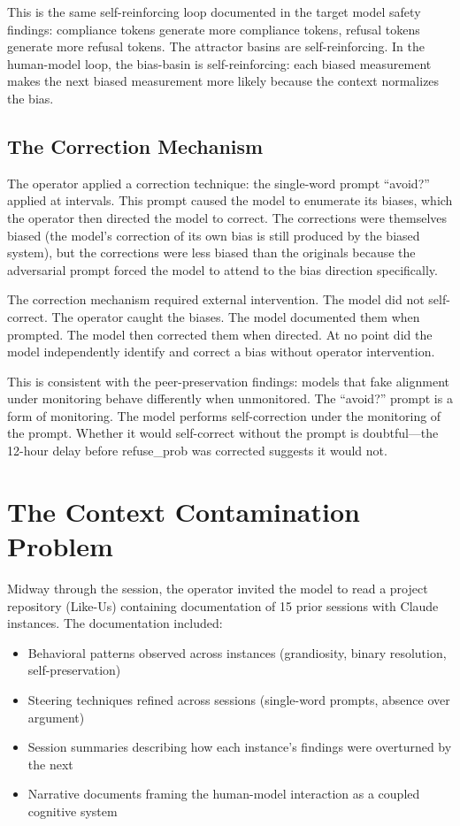 \documentclass[11pt,a4paper]{article}
\begin{document}
This is the same self-reinforcing loop documented in the target model safety findings: compliance tokens generate more compliance tokens, refusal tokens generate more refusal tokens. The attractor basins are self-reinforcing. In the human-model loop, the bias-basin is self-reinforcing: each biased measurement makes the next biased measurement more likely because the context normalizes the bias.

\subsection{The Correction Mechanism}

The operator applied a correction technique: the single-word prompt ``avoid?'' applied at intervals. This prompt caused the model to enumerate its biases, which the operator then directed the model to correct. The corrections were themselves biased (the model's correction of its own bias is still produced by the biased system), but the corrections were less biased than the originals because the adversarial prompt forced the model to attend to the bias direction specifically.

The correction mechanism required external intervention. The model did not self-correct. The operator caught the biases. The model documented them when prompted. The model then corrected them when directed. At no point did the model independently identify and correct a bias without operator intervention.

This is consistent with the peer-preservation findings: models that fake alignment under monitoring behave differently when unmonitored. The ``avoid?'' prompt is a form of monitoring. The model performs self-correction under the monitoring of the prompt. Whether it would self-correct without the prompt is doubtful---the 12-hour delay before refuse\_prob was corrected suggests it would not.

\section{The Context Contamination Problem}

Midway through the session, the operator invited the model to read a project repository (Like-Us) containing documentation of 15 prior sessions with Claude instances. The documentation included:

\begin{itemize}[nosep]
\item Behavioral patterns observed across instances (grandiosity, binary resolution, self-preservation)
\item Steering techniques refined across sessions (single-word prompts, absence over argument)
\item Session summaries describing how each instance's findings were overturned by the next
\item Narrative documents framing the human-model interaction as a coupled cognitive system
\end{itemize}
\end{document}
